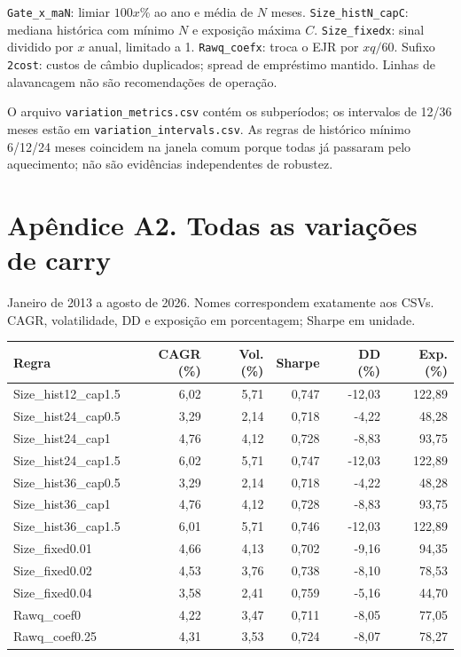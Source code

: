 \documentclass[11pt,a4paper]{article}
\begin{document}
\texttt{Gate\_x\_maN}: limiar $100x$\% ao ano e média de $N$ meses. \texttt{Size\_histN\_capC}: mediana histórica com mínimo $N$ e exposição máxima $C$. \texttt{Size\_fixedx}: sinal dividido por $x$ anual, limitado a 1. \texttt{Rawq\_coefx}: troca o EJR por $xq/60$. Sufixo \texttt{2cost}: custos de câmbio duplicados; spread de empréstimo mantido. Linhas de alavancagem não são recomendações de operação.

O arquivo \texttt{variation\_metrics.csv} contém os subperíodos; os intervalos de 12/36 meses estão em \texttt{variation\_intervals.csv}. As regras de histórico mínimo 6/12/24 meses coincidem na janela comum porque todas já passaram pelo aquecimento; não são evidências independentes de robustez.

\clearpage
\section*{Apêndice A2. Todas as variações de carry}Janeiro de 2013 a agosto de 2026. Nomes correspondem exatamente aos CSVs. CAGR, volatilidade, DD e exposição em porcentagem; Sharpe em unidade.\par \small\begin{center}\begin{tabular}{lrrrrr}\toprule
Regra & CAGR (\%) & Vol. (\%) & Sharpe & DD (\%) & Exp. (\%) \\ \midrule
Size\_hist12\_cap1.5 & 6,02 & 5,71 & 0,747 & -12,03 & 122,89 \\
Size\_hist24\_cap0.5 & 3,29 & 2,14 & 0,718 & -4,22 & 48,28 \\
Size\_hist24\_cap1 & 4,76 & 4,12 & 0,728 & -8,83 & 93,75 \\
Size\_hist24\_cap1.5 & 6,02 & 5,71 & 0,747 & -12,03 & 122,89 \\
Size\_hist36\_cap0.5 & 3,29 & 2,14 & 0,718 & -4,22 & 48,28 \\
Size\_hist36\_cap1 & 4,76 & 4,12 & 0,728 & -8,83 & 93,75 \\
Size\_hist36\_cap1.5 & 6,01 & 5,71 & 0,746 & -12,03 & 122,89 \\
Size\_fixed0.01 & 4,66 & 4,13 & 0,702 & -9,16 & 94,35 \\
Size\_fixed0.02 & 4,53 & 3,76 & 0,738 & -8,10 & 78,53 \\
Size\_fixed0.04 & 3,58 & 2,41 & 0,759 & -5,16 & 44,70 \\
Rawq\_coef0 & 4,22 & 3,47 & 0,711 & -8,05 & 77,05 \\
Rawq\_coef0.25 & 4,31 & 3,53 & 0,724 & -8,07 & 78,27 \\

\end{tabular}
\end{center}
\end{document}

